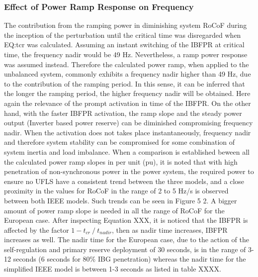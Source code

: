 \subsubsection{Effect of Power Ramp Response on Frequency}

The contribution from the ramping power in diminishing system RoCoF during the inception of the perturbation until the critical time was disregarded when EQ:tcr was calculated. Assuming an instant switching of the IBFPR at critical time, the frequency nadir would be 49 Hz. Nevertheless, a ramp power response was assumed instead. Therefore the calculated power ramp, when applied to the unbalanced system, commonly exhibits a frequency nadir higher than 49 Hz, due to the contribution of the ramping period. In this sense, it can be inferred that the longer the ramping period, the higher frequency nadir will be obtained. Here again the relevance of the prompt activation in time of the IBFPR. On the other hand, with the faster IBFPR activation, the ramp slope and the steady power output (Inverter based power reserve) can be diminished compromising frequency nadir.
When the activation does not takes place instantaneously, frequency nadir and therefore system stability can be compromised for some combination of system inertia and load imbalance. %
When a comparison is established beween all the calculated power ramp slopes in per unit  (pu), it is noted that with high penetration of non-synchronous power in the power system, the required power to ensure no UFLS have a consistent trend between the three models, and a close proximity in the values for RoCoF in the range of 2 to 5 Hz/s is observed between both IEEE models. Such trends can be seen in Figure 5 2.
A bigger amount of power ramp slope is needed in all the range of RoCoF for the European case. After inspecting Equation XXX, it is noticed that the IBFPR is affected by the factor $ 1-t_{cr}⁄t_{nadir} $, then as nadir time increases, IBFPR increases as well. The nadir time for the European case, due to the action of the self-regulation and primary reserve deployment of 30 seconds, is in the range of 3-12 seconds (6 seconds for 80\% IBG penetration) whereas the nadir time for the simplified IEEE model is between 1-3 seconds as listed in table XXXX.

